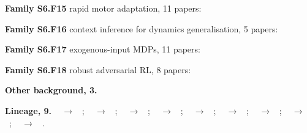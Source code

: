 \documentclass[10pt]{article}
\newcommand{\memb}[1]{\par\smallskip\textbf{#1}\quad}
\begin{document}
\memb{Family S6.F15} rapid motor adaptation, 11 papers: {\footnotesize \citetext{\citealp{Kumar-rma21}; \citealp{OConnell-neuralfly22}; \citealp{Kumar-adapting22}; \citealp{Margolis-rapid22}; \citealp{Qi-inhand22}; \citealp{Liang-rapid23}; \citealp{Long-hybrid23}; \citealp{Chen-slr24}; \citealp{Brito-world25}; \citealp{Eschmann-raptor25}; \citealp{Zhang-interpreting26}}}

\memb{Family S6.F16} context inference for dynamics generalisation, 5 papers: {\footnotesize \citetext{\citealp{Evans-context22}; \citealp{Beukman-dynamics23}; \citealp{Li-towards24}; \citealp{MurilloGonzalez-situationally25}; \citealp{Yang-unified26}}}

\memb{Family S6.F17} exogenous-input MDPs, 11 papers: {\footnotesize \citetext{\citealp{Sinclair-hindsight22}; \citealp{Wan-exploiting24}; \citealp{Maran-learning26}; \citealp{Mao-variance18}; \citealp{Guo-hindsight21}; \citealp{Alomar-causalsim22}; \citealp{Hamadanian-online23}; \citealp{Tennenholtz-reinforcement23}; \citealp{Kaya-joint26}; \citealp{Liang-pure26}; \citealp{Pla-minimax26}}}

\memb{Family S6.F18} robust adversarial RL, 8 papers: {\footnotesize \citetext{\citealp{Morimoto-robust05}; \citealp{Pinto-robust17}; \citealp{Pan-risk19}; \citealp{Wang-falsificationbased20}; \citealp{Huang-robust22}; \citealp{Reddi-robust23}; \citealp{Wu-uacer25}; \citealp{Mohan-roadrl26}}}

\memb{Other background, 3.} {\footnotesize \citetext{\citealp{Lin-online22}; \citealp{Zeng-moving23}; \citealp{Fujinami-policy26}}}

\memb{Lineage, 9.} {\footnotesize \citeauthor{Morimoto-robust05}~\citeyear{Morimoto-robust05} $\to$ \citeauthor{Pinto-robust17}~\citeyear{Pinto-robust17}; \citeauthor{Mao-variance18}~\citeyear{Mao-variance18} $\to$ \citeauthor{Sinclair-hindsight22}~\citeyear{Sinclair-hindsight22}; \citeauthor{Kumar-rma21}~\citeyear{Kumar-rma21} $\to$ \citeauthor{Evans-context22}~\citeyear{Evans-context22}; \citeauthor{Evans-context22}~\citeyear{Evans-context22} $\to$ \citeauthor{Chen-slr24}~\citeyear{Chen-slr24}; \citeauthor{OConnell-neuralfly22}~\citeyear{OConnell-neuralfly22} $\to$ \citeauthor{Gao-neural24}~\citeyear{Gao-neural24}; \citeauthor{Sinclair-hindsight22}~\citeyear{Sinclair-hindsight22} $\to$ \citeauthor{Wan-exploiting24}~\citeyear{Wan-exploiting24}; \citeauthor{Sinclair-hindsight22}~\citeyear{Sinclair-hindsight22} $\to$ \citeauthor{Maran-learning26}~\citeyear{Maran-learning26}; \citeauthor{Chen-slr24}~\citeyear{Chen-slr24} $\to$ \citeauthor{Fujinami-policy26}~\citeyear{Fujinami-policy26}; \citeauthor{Maran-learning26}~\citeyear{Maran-learning26} $\to$ \citeauthor{Liang-pure26}~\citeyear{Liang-pure26}.}
\end{document}
